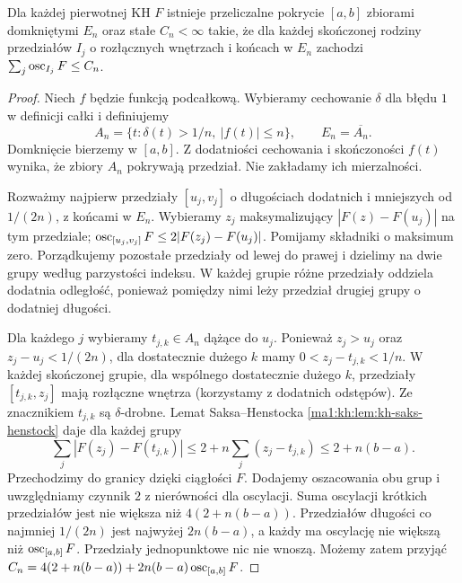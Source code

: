 \begin{lemat}
\label{ma1:kh:lem:kh-bvstar-cover}\label{it:lem:kh-bvstar-cover}
Dla każdej pierwotnej KH $F$ istnieje przeliczalne pokrycie $[a,b]$ zbiorami domkniętymi $E_n$ oraz stałe $C_n<\infty$ takie, że dla każdej skończonej rodziny przedziałów $I_j$ o rozłącznych wnętrzach i końcach w $E_n$ zachodzi $\sum_j\operatorname{osc}_{I_j}F\le C_n$.
\end{lemat}
\begin{proof}
Niech $f$ będzie funkcją podcałkową. Wybieramy cechowanie $\delta$ dla błędu $1$ w definicji całki i definiujemy
\[
 A_n=\{t:\delta(t)>1/n,\ |f(t)|\le n\},\qquad E_n=\overline{A_n}.
\]
Domknięcie bierzemy w $[a,b]$. Z dodatniości cechowania i skończoności $f(t)$ wynika, że zbiory $A_n$ pokrywają przedział. Nie zakładamy ich mierzalności.

Rozważmy najpierw przedziały $[u_j,v_j]$ o długościach dodatnich i mniejszych od $1/(2n)$, z końcami w $E_n$. Wybieramy $z_j$ maksymalizujący $|F(z)-F(u_j)|$ na tym przedziale; $\operatorname{osc}_{[u_j,v_j]}F\le2|F(z_j)-F(u_j)|$. Pomijamy składniki o maksimum zero. Porządkujemy pozostałe przedziały od lewej do prawej i dzielimy na dwie grupy według parzystości indeksu. W każdej grupie różne przedziały oddziela dodatnia odległość, ponieważ pomiędzy nimi leży przedział drugiej grupy o dodatniej długości.

Dla każdego $j$ wybieramy $t_{j,k}\in A_n$ dążące do $u_j$. Ponieważ $z_j>u_j$ oraz $z_j-u_j<1/(2n)$, dla dostatecznie dużego $k$ mamy $0<z_j-t_{j,k}<1/n$. W każdej skończonej grupie, dla wspólnego dostatecznie dużego $k$, przedziały $[t_{j,k},z_j]$ mają rozłączne wnętrza (korzystamy z dodatnich odstępów). Ze znacznikiem $t_{j,k}$ są $\delta$-drobne. Lemat Saksa--Henstocka \ref{ma1:kh:lem:kh-saks-henstock} daje dla każdej grupy
\[
 \sum_j |F(z_j)-F(t_{j,k})|
 \le 2+n\sum_j(z_j-t_{j,k})\le2+n(b-a).
\]
Przechodzimy do granicy dzięki ciągłości $F$. Dodajemy oszacowania obu grup i uwzględniamy czynnik $2$ z nierówności dla oscylacji. Suma oscylacji krótkich przedziałów jest nie większa niż $4(2+n(b-a))$. Przedziałów długości co najmniej $1/(2n)$ jest najwyżej $2n(b-a)$, a każdy ma oscylację nie większą niż $\operatorname{osc}_{[a,b]}F$. Przedziały jednopunktowe nic nie wnoszą. Możemy zatem przyjąć $C_n=4(2+n(b-a))+2n(b-a)\operatorname{osc}_{[a,b]}F$.
\end{proof}

